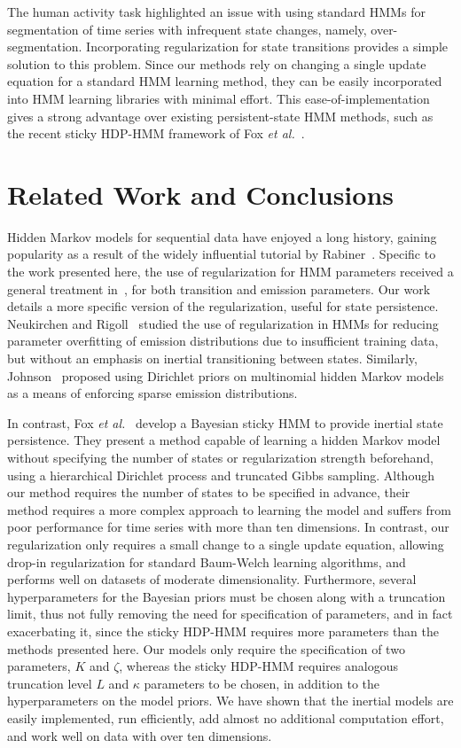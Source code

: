\documentclass[12pt]{article}
\begin{document}
The human activity task highlighted an issue with using standard HMMs for segmentation of time series with infrequent state changes, namely, over-segmentation. Incorporating regularization for state transitions provides a simple solution to this problem. Since our methods rely on changing a single update equation for a standard HMM learning method, they can be easily incorporated into HMM learning libraries with minimal effort. This ease-of-implementation gives a strong advantage over existing persistent-state HMM methods, such as the recent sticky HDP-HMM framework of Fox \emph{et al.}~\cite{fox2011sticky}.

\section{Related Work and Conclusions}

Hidden Markov models for sequential data have enjoyed a long history, gaining popularity as a result of the widely influential tutorial by Rabiner~\cite{rabiner1989tutorial}. Specific to the work presented here, the use of regularization for HMM parameters received a general treatment in~\cite{MAP1994}, for both transition and emission parameters. Our work details a more specific version of the regularization, useful for state persistence. Neukirchen and Rigoll~\cite{neukirchen1999controlling} studied the use of regularization in HMMs for reducing parameter overfitting of emission distributions due to insufficient training data, but without an emphasis on inertial transitioning between states. Similarly, Johnson~\cite{Johnson07whydoesnt} proposed using Dirichlet priors on multinomial hidden Markov models as a means of enforcing sparse emission distributions. 

In contrast, Fox \emph{et al.}\ \cite{fox2011sticky} develop a Bayesian sticky HMM to provide inertial state persistence. They present a method capable of learning a hidden Markov model without specifying the number of states or regularization strength beforehand, using a hierarchical Dirichlet process and truncated Gibbs sampling. Although our method requires the number of states to be specified in advance, their method requires a more complex approach to learning the model and suffers from poor performance for time series with more than ten dimensions. In contrast, our regularization only requires a small change to a single update equation, allowing drop-in regularization for standard Baum-Welch learning algorithms, and performs well on datasets of moderate dimensionality. Furthermore, several hyperparameters for the Bayesian priors must be chosen along with a truncation limit, thus not fully removing the need for specification of parameters, and in fact exacerbating it, since the sticky HDP-HMM requires more parameters than the methods presented here. Our models only require the specification of two parameters, $K$ and $\zeta$, whereas the sticky HDP-HMM requires analogous truncation level $L$ and $\kappa$ parameters to be chosen, in addition to the hyperparameters on the model priors. We have shown that the inertial models are easily implemented, run efficiently, add almost no additional computation effort, and work well on data with over ten dimensions.
\end{document}
